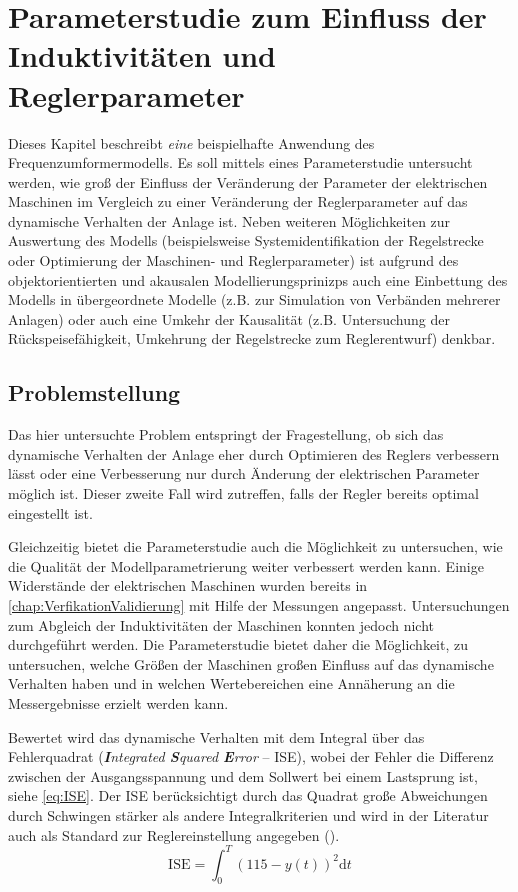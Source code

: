 \chapter{Parameterstudie zum Einfluss der Induktivitäten und Reglerparameter}
\label{chap:Auswertung}
Dieses Kapitel beschreibt \emph{eine} beispielhafte Anwendung des Frequenzumformermodells. Es soll mittels eines Parameterstudie untersucht werden, wie groß der Einfluss der Veränderung der Parameter der elektrischen Maschinen im Vergleich zu einer Veränderung der Reglerparameter auf das dynamische Verhalten der Anlage ist. Neben weiteren Möglichkeiten zur Auswertung des Modells (beispielsweise Systemidentifikation der Regelstrecke oder Optimierung der Maschinen- und Reglerparameter) ist aufgrund des objektorientierten und akausalen Modellierungsprinizps auch eine Einbettung des Modells in übergeordnete Modelle (z.B. zur Simulation von Verbänden mehrerer Anlagen) oder auch eine Umkehr der Kausalität (z.B. Untersuchung der Rückspeisefähigkeit, Umkehrung der Regelstrecke zum Reglerentwurf) denkbar.

\section{Problemstellung}
\label{sec:ProblemstellungParameterSweep}
Das hier untersuchte Problem entspringt der Fragestellung, ob sich das dynamische Verhalten der Anlage eher durch Optimieren des Reglers verbessern lässt oder eine Verbesserung nur durch Änderung der elektrischen Parameter möglich ist. Dieser zweite Fall wird zutreffen, falls der Regler bereits optimal eingestellt ist. 

Gleichzeitig bietet die Parameterstudie auch die Möglichkeit zu untersuchen, wie die Qualität der Modellparametrierung weiter verbessert werden kann. Einige Widerstände der elektrischen Maschinen wurden bereits in \cref{chap:VerfikationValidierung} mit Hilfe der Messungen angepasst. Untersuchungen zum Abgleich der Induktivitäten der Maschinen konnten jedoch nicht durchgeführt werden. Die Parameterstudie bietet daher die Möglichkeit, zu untersuchen, welche Größen der Maschinen großen Einfluss auf das dynamische Verhalten haben und in welchen Wertebereichen eine Annäherung an die Messergebnisse erzielt werden kann.

Bewertet wird das dynamische Verhalten mit dem Integral über das Fehlerquadrat (\emph{\textbf{I}ntegrated \textbf{S}quared \textbf{E}rror} -- ISE), wobei der Fehler die Differenz zwischen der Ausgangsspannung und dem Sollwert bei einem Lastsprung ist, siehe \cref{eq:ISE}. Der ISE berücksichtigt durch das Quadrat große Abweichungen durch Schwingen stärker als andere Integralkriterien und wird in der Literatur auch als Standard zur Reglereinstellung angegeben (\cite[S.~190]{unbehauenRegelungstechnikKlassischeVerfahren2008}).
\begin{equation}
    \label{eq:ISE}
    \mathrm{ISE} = \int_0^T (115-y(t))^2 \mathrm{d}t
\end{equation}

